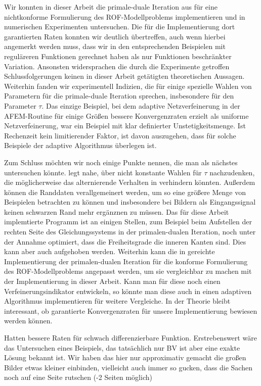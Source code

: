 Wir konnten in dieser Arbeit die primale-duale Iteration aus
\cite{Bar15} für eine nichtkonforme Formulierung des ROF-Modellproblems
implementieren und in numerischen Experimenten untersuchen. 
Die für die Implementierung dort garantierten Raten konnten wir deutlich 
übertreffen, auch wenn hierbei angemerkt werden muss, dass wir in den
entsprechenden Beispielen mit reguläreren Funktionen gerechnet haben
als nur Funktionen beschränkter Variation.
Ansonsten widersprachen die durch die Experimente getroffen Schlussfolgerungen
keinen in dieser Arbeit getätigten theoretischen Aussagen.
Weiterhin fanden wir experimentell Indizien, die für einige spezielle Wahlen
von Parametern für die primale-duale Iteration sprechen, insbesondere
für den Parameter $\tau$.
Das einzige Beispiel, bei dem adaptive Netzverfeinerung in der 
AFEM-Routine für einige Größen bessere Konvergenzraten erzielt als uniforme
Netzverfeinerung, war ein Beispiel mit klar definierter Unstetigkeitsmenge.
Ist Rechenzeit kein limitierender Faktor, ist davon auszugehen, dass für
solche Beispiele der adaptive Algorithmus überlegen ist.

Zum Schluss möchten wir noch einige Punkte nennen, die man als nächstes
untersuchen könnte.
 legt nahe, über nicht konstante Wahlen für
$\tau$ nachzu\-denken, die mög\-lich\-er\-wei\-se das alternierende Verhalten in
 verhindern könnten.
Außerdem können die Randdaten verallgemeinert werden, um so eine größere
Menge von Beispielen betrachten zu können und insbesondere bei Bildern
als Eingangssignal keinen schwarzen Rand mehr ergänznen zu müssen. 
Das für diese Arbeit implemtierte Programm ist an einigen Stellen, zum Beispiel
beim Aufstellen der rechten Seite des Gleichungssystems in der primalen-dualen
Iteration, noch unter der Annahme optimiert, dass die Freiheitsgrade die inneren
Kanten sind.  
Dies kann aber auch aufgehoben werden.
Weiterhin kann die in \cite{Bar15} gereichte Implementierung der primalen-dualen
Iteration für die konforme Formulierung des ROF-Modellproblems angepasst werden,
um sie vergleichbar zu machen mit der Implementierung in dieser Arbeit. 
Kann man für diese noch einen Verfeinerungsindikator entwickeln, so könnte man
diese auch in einen adaptiven Algorithmus implementieren für weitere Vergleiche.
In der Theorie bleibt interessant, ob garantierte Konvergenzraten für unsere
Implementierung bewiesen werden können.

Hatten bessere Raten für schwach differenzierbare Funktion. Erstrebenswert
wäre das Untersuchen eines Beispiels, das tatsächlich nur BV ist aber
eine exakte Lösung bekannt ist. Wir haben das hier nur approximativ gemacht
die großen Bilder etwas kleiner einbinden, vielleicht auch immer so gucken,
dass die Sachen noch auf eine Seite rutschen (-2 Seiten möglich)
